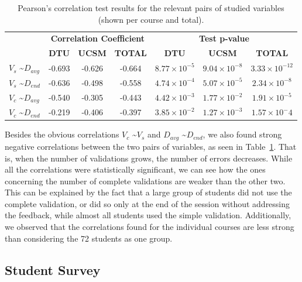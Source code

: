 \begin{table}
{\scriptsize
\begin{tabular}{l|c c c| c c c }
& \multicolumn{3}{|c|}{\textbf{Correlation Coefficient}} & \multicolumn{3}{|c}{\textbf{Test p-value}} \\
& \textbf{DTU} & \textbf{UCSM} & \textbf{TOTAL} & \textbf{DTU} & \textbf{UCSM} & \textbf{TOTAL} \\
\hline
$V_s$ \textasciitilde $D_{avg}$ & -0.693 & -0.626 & -0.664 & $8.77\times10^{-5}$ & $9.04\times10^{-8}$ & $3.33\times10^{-12}$ \\
$V_s$ \textasciitilde $D_{end}$ & -0.636 & -0.498 & -0.558 & $4.74\times10^{-4}$ & $5.07\times10^{-5}$ & $2.34\times10^{-8}$ \\
$V_c$ \textasciitilde $D_{avg}$ & -0.540 & -0.305 & -0.443 & $4.42\times10^{-3}$ & $1.77\times10^{-2}$ & $ 1.91\times10^{-5}$ \\
$V_c$ \textasciitilde $D_{end}$ & -0.219 & -0.406 & -0.397 & $3.85\times10^{-2}$ & $1.27\times10^{-3}$ & $1.57\times10^-4$ \\
\hline
\end{tabular}}
\caption{Pearson's correlation test results for the relevant pairs of studied variables (shown per course and total).}
\label{tab:correlations}
\end{table}

Besides the obvious correlations $V_c$ \textasciitilde $V_s$ and $D_{avg}$
\textasciitilde $D_{end}$, we also found strong negative correlations between
the two pairs of variables, as seen in Table~\ref{tab:correlations}. That is,
when the number of validations grows, the number of errors decreases. While all
the correlations were statistically significant, we can see how the ones
concerning the number of complete validations are weaker than the other two.
This can be explained by the fact that a large group of students did not use the
complete validation, or did so only at the end of the session without addressing
the feedback, while almost all students used the simple validation.
Additionally, we observed that the correlations found for the individual courses
are less strong than considering the 72 students as one group.


\subsection{Student Survey}
\label{sec:questionaires}

